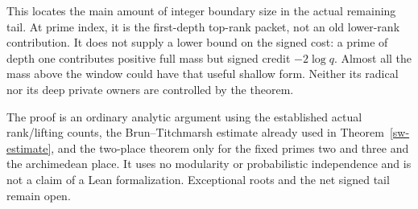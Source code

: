This locates the main amount of integer boundary size in the actual
remaining tail. At prime index, it is the first-depth top-rank packet,
not an old lower-rank contribution. It does not supply a lower bound
on the signed cost: a prime of depth one contributes positive full
mass but signed credit $-2\log q$. Almost all the mass above the
window could have that useful shallow form. Neither its radical nor
its deep private owners are controlled by the theorem.

The proof is an ordinary analytic argument using the established
actual rank/lifting counts, the Brun--Titchmarsh estimate already
used in Theorem~\ref{sw-estimate}, and the two-place theorem only
for the fixed primes two and three and the archimedean place.
It uses no modularity or probabilistic independence and is not a
claim of a Lean formalization. Exceptional roots and the net signed
tail remain open.
